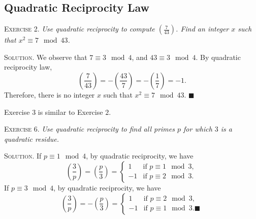 \documentclass[11pt, leqno]{article}
\newcommand{\done}{\ensuremath{\blacksquare}}
\begin{document}
\subsection{Quadratic Reciprocity Law}

\textsc{Exercise 2}. \emph{Use quadratic reciprocity to compute $\left( \frac{7}{43} \right)$. Find an integer $x$ such that $x^2 \equiv 7 \mod 43$.}

\textsc{Solution}. We observe that $7 \equiv 3 \mod 4$, and $43 \equiv 3 \mod 4$. By quadratic reciprocity law, 
\begin{displaymath}
\left( \frac{7}{43} \right) = -\left( \frac{43}{7} \right) = -\left( \frac{1}{7} \right) = -1.
\end{displaymath}
Therefore, there is no integer $x$ such that $x^2 \equiv 7 \mod 43$. \done

Exercise $3$ is similar to Exercise $2$.

\textsc{Exercise 6}. \emph{Use quadratic reciprocity to find all primes $p$ for which $3$ is a quadratic residue.}

\textsc{Solution}. If $p \equiv 1 \mod 4$, by quadratic reciprocity, we have 
\begin{displaymath}
\left( \frac{3}{p} \right) = \left( \frac{p}{3} \right) =
\begin{cases}
  1 & \text{if } p \equiv 1 \mod 3,\\
  -1 & \text{if } p \equiv 2 \mod 3.\
\end{cases}
\end{displaymath}
If $p \equiv 3 \mod 4$, by quadratic reciprocity, we have 
\begin{displaymath}
\left( \frac{3}{p} \right) = -\left( \frac{p}{3} \right) =
\begin{cases}
  1 & \text{if } p \equiv 2 \mod 3,\\
  -1 & \text{if } p \equiv 1 \mod 3. \done
\end{cases}
\end{displaymath}
\end{document}

